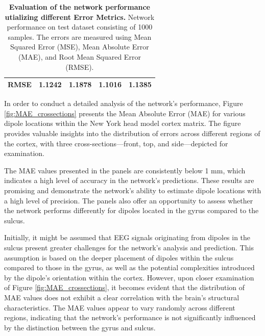 \documentclass[a4paper, UKenglish, 11pt]{uiomaster}
\begin{document}
\begin{table}[!htb]
\begin{tabular}{l|cccc|}
\multicolumn{1}{|l|}{\cellcolor[HTML]{EFEFEF}RMSE} & \multicolumn{1}{c|}{1.1242}                                                                                  & \multicolumn{1}{c|}{1.1878}                                                                                   & \multicolumn{1}{c|}{1.1016}                                                                                   & 1.1385                                                                                                              \\ \hline
\end{tabular}
\caption{\textbf{Evaluation of the network performance utializing different Error Metrics.} \newline
Network performance on test dataset consisting of 1000 samples. The errors are measured using Mean Squared Error (MSE), Mean Absolute Error (MAE), and Root Mean Squared Error (RMSE).}
\label{table:error_simple_dipole}
\end{table}

In order to conduct a detailed analysis of the network's performance, Figure \ref{fig:MAE_crossections} presents the Mean Absolute Error (MAE) for various dipole locations within the New York head model cortex matrix. The figure provides valuable insights into the distribution of errors across different regions of the cortex, with three cross-sections—front, top, and side—depicted for examination.

The MAE values presented in the panels are consistently below 1 mm, which indicates a high level of accuracy in the network's predictions. These results are promising and demonstrate the network's ability to estimate dipole locations with a high level of precision. The panels also offer an opportunity to assess whether the network performs differently for dipoles located in the gyrus compared to the sulcus.

Initially, it might be assumed that EEG signals originating from dipoles in the sulcus present greater challenges for the network's analysis and prediction. This assumption is based on the deeper placement of dipoles within the sulcus compared to those in the gyrus, as well as the potential complexities introduced by the dipole's orientation within the cortex. However, upon closer examination of Figure \ref{fig:MAE_crossections}, it becomes evident that the distribution of MAE values does not exhibit a clear correlation with the brain's structural characteristics. The MAE values appear to vary randomly across different regions, indicating that the network's performance is not significantly influenced by the distinction between the gyrus and sulcus.
\end{document}
